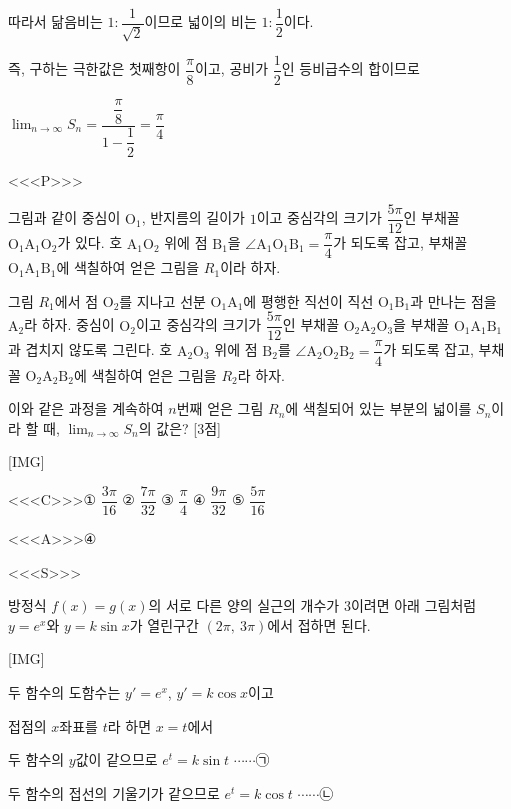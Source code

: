 \documentclass{oblivoir}
\begin{document}
따라서 닮음비는 $1 :\dfrac{1}{\sqrt{2}}$이므로 넓이의 비는 $1 :\dfrac{1}{2}$이다.

즉, 구하는 극한값은 첫째항이 $\dfrac{\pi}{8}$이고, 공비가 $\dfrac{1}{2}$인 등비급수의 합이므로

$\displaystyle\lim_{n\to \infty}S_{n}=\dfrac{\dfrac{\pi}{8}}{1-\dfrac{1}{2}}=\dfrac{\pi}{4}$

<<<P>>>

그림과 같이 중심이 $\mathrm{O}_{1}$, 반지름의 길이가 $1$이고 중심각의 크기가 $\dfrac{5\pi}{12}$인 부채꼴 $\mathrm{O}_{1}\mathrm{A}_{1}\mathrm{O}_{2}$가 있다. 호 $\mathrm{A}_{1}\mathrm{O}_{2}$ 위에 점 $\mathrm{B}_{1}$을 $∠\mathrm{A}_{1}\mathrm{O}_{1}\mathrm{B}_{1}=\dfrac{\pi}{4}$가 되도록 잡고, 부채꼴 $\mathrm{O}_{1}\mathrm{A}_{1}\mathrm{B}_{1}$에 색칠하여 얻은 그림을 $R_{1}$이라 하자.

그림 $R_{1}$에서 점 $\mathrm{O}_{2}$를 지나고 선분 $\mathrm{O}_{1}\mathrm{A}_{1}$에 평행한 직선이 직선 $\mathrm{O}_{1}\mathrm{B}_{1}$과 만나는 점을 $\mathrm{A}_{2}$라 하자. 중심이 $\mathrm{O}_{2}$이고 중심각의 크기가 $\dfrac{5\pi}{12}$인 부채꼴 $\mathrm{O}_{2}\mathrm{A}_{2}\mathrm{O}_{3}$을 부채꼴 $\mathrm{O}_{1}\mathrm{A}_{1}\mathrm{B}_{1}$과 겹치지 않도록 그린다. 호 $\mathrm{A}_{2}\mathrm{O}_{3}$ 위에 점 $\mathrm{B}_{2}$를 $∠\mathrm{A}_{2}\mathrm{O}_{2}\mathrm{B}_{2}=\dfrac{\pi}{4}$가 되도록 잡고, 부채꼴 $\mathrm{O}_{2}\mathrm{A}_{2}\mathrm{B}_{2}$에 색칠하여 얻은 그림을 $R_{2}$라 하자.

이와 같은 과정을 계속하여 $n$번째 얻은 그림 $R_{n}$에 색칠되어 있는 부분의 넓이를 $S_{n}$이라 할 때, $\displaystyle\lim_{n\to \infty}S_{n}$의 값은? [3점]

[IMG]

<<<C>>>① $\dfrac{3\pi}{16}$ ② $\dfrac{7\pi}{32}$ ③ $\dfrac{\pi}{4}$ ④ $\dfrac{9\pi}{32}$ ⑤ $\dfrac{5\pi}{16}$

<<<A>>>④

<<<S>>>

방정식 $f(x)=g(x)$의 서로 다른 양의 실근의 개수가 $3$이려면 아래 그림처럼 $y=e^{x}$와 $y=k\sin x$가 열린구간 $(2\pi ,\: 3\pi)$에서 접하면 된다.

[IMG]

두 함수의 도함수는 $y'=e^{x}$, $y'= k\cos x$이고

접점의 $x$좌표를 $t$라 하면 $x=t$에서

두 함수의 $y$값이 같으므로 $e^{t}=k\sin t$ $\cdots\cdots$㉠

두 함수의 접선의 기울기가 같으므로 $e^{t}=k\cos t$ $\cdots\cdots$㉡
\end{document}
